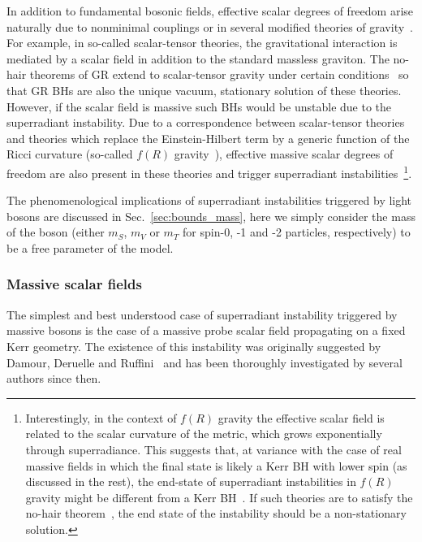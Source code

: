 \documentclass[11pt]{article}
\numberwithin{equation}{section} %
\begin{document}
In addition to fundamental bosonic fields, effective scalar degrees of freedom arise naturally due to nonminimal couplings or in several modified theories of gravity~\cite{Berti:2015itd}.
For example, in so-called scalar-tensor theories, the gravitational interaction is mediated by a scalar field in addition to the standard massless graviton. The no-hair theorems of GR extend to scalar-tensor gravity under certain conditions~\cite{Sotiriou:2011dz} so that GR BHs are also the unique vacuum, stationary solution of these theories. However, if the scalar field is massive such BHs would be unstable due to the superradiant instability. Due to a correspondence between scalar-tensor theories and theories which replace the Einstein-Hilbert term by a generic function of the Ricci curvature (so-called $f(R)$ gravity~\cite{Berti:2015itd}), effective massive scalar degrees of freedom are also present in these theories and trigger superradiant instabilities~\cite{Hersh:1985hz}\footnote{Interestingly, in the context of $f(R)$ gravity the effective scalar field is related to the scalar curvature of the metric, which grows exponentially through superradiance. This suggests that, at variance with the case of real massive fields in which the final state is likely a Kerr BH with lower spin (as discussed in the rest), the end-state of superradiant instabilities in $f(R)$ gravity might be different from a Kerr BH~\cite{Hersh:1985hz}. If such theories are to satisfy the no-hair theorem~\cite{Sotiriou:2011dz}, the end state of the instability should be a non-stationary solution.}. 

The phenomenological implications of superradiant instabilities triggered by light bosons are discussed in Sec.~\ref{sec:bounds_mass}, here we simply consider the mass of the boson (either $m_S$, $m_V$ or $m_T$ for spin-0, -1 and -2 particles, respectively) to be a free parameter of the model.

\subsubsection{Massive scalar fields}
The simplest and best understood case of superradiant instability triggered by massive bosons is the case of a massive probe scalar field propagating on a fixed Kerr geometry. 
The existence of this instability was originally suggested by Damour, Deruelle and Ruffini~\cite{Damour:1976kh} and has been thoroughly investigated by several authors since then.
\end{document}
